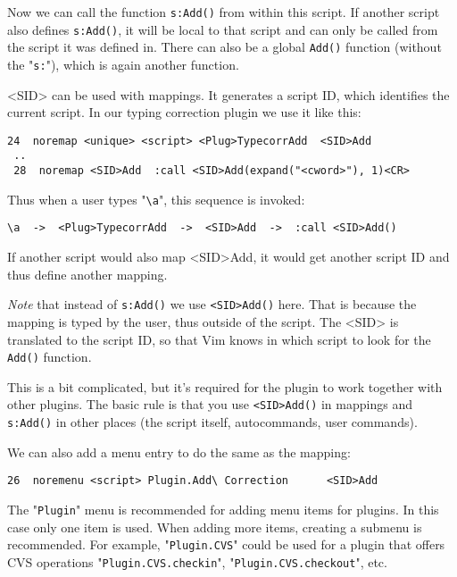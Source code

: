 Now we can call the function \verb!s:Add()! from within this script.
If another script also defines \verb!s:Add()!, it will be local to that script and can only be called from the script it was defined in.
There can also be a global \verb!Add()!  function (without the "\verb!s:!"), which is again another function.

<SID> can be used with mappings.
It generates a script ID, which identifies the current script.
In our typing correction plugin we use it like this:

\begin{Verbatim}[samepage=true]
 24  noremap <unique> <script> <Plug>TypecorrAdd  <SID>Add
 ..
 28  noremap <SID>Add  :call <SID>Add(expand("<cword>"), 1)<CR>
\end{Verbatim}

Thus when a user types "\verb!\a!", this sequence is invoked:

\begin{Verbatim}[samepage=true]
 \a  ->  <Plug>TypecorrAdd  ->  <SID>Add  ->  :call <SID>Add()
\end{Verbatim}

If another script would also map <SID>Add, it would get another script ID and thus define another mapping.

\emph{Note} that instead of \verb!s:Add()! we use \verb!<SID>Add()! here.
That is because the mapping is typed by the user, thus outside of the script.
The <SID> is translated to the script ID, so that Vim knows in which script to look for the \verb!Add()! function.

This is a bit complicated, but it's required for the plugin to work together with other plugins.
The basic rule is that you use \verb!<SID>Add()! in mappings and \verb!s:Add()! in other places (the script itself, autocommands, user commands).

We can also add a menu entry to do the same as the mapping:

\begin{Verbatim}[samepage=true]
 26  noremenu <script> Plugin.Add\ Correction      <SID>Add
\end{Verbatim}

The "\verb!Plugin!" menu is recommended for adding menu items for plugins.
In this case only one item is used.
When adding more items, creating a submenu is recommended.
For example, "\verb!Plugin.CVS!" could be used for a plugin that offers CVS operations "\verb!Plugin.CVS.checkin!", "\verb!Plugin.CVS.checkout!", etc.

